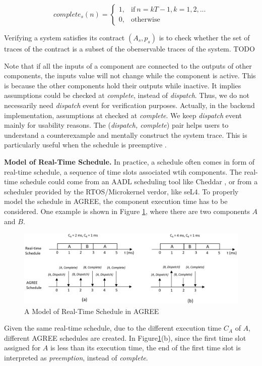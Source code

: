 \begin{equation}
\label{eqn:sys_complete}
    complete_s(n) =
    \begin{cases}
      1, & \text{if}\ n = kT-1, k=1,2,... \\
      0, & \text{otherwise}
    \end{cases}
\end{equation}

Verifying a system satisfies its contract $(A_s, p_s)$ is to check whether the set of traces of the contract is a subset of the oberservable traces of the system. TODO

Note that if all the inputs of a component are connected to the outputs of other components, the inputs value will not change while the component is active. This is because the other components hold their outputs while inactive. It implies assumptions could be checked at \emph{complete}, instead of \emph{dispatch}. Thus, we do not necessarily need \emph{dispatch} event for verification purposes. Actually, in the backend implementation, assumptions at checked at \emph{complete}. We keep \emph{dispatch} event mainly for usability reasons. The (\emph{dispatch, complete}) pair helps users to understand a counterexample and mentally construct the system trace. This is particularly useful when the schedule is preemptive .

{\bf Model of Real-Time Schedule.}
In practice, a schedule often comes in form of real-time schedule, a sequence of time slots associated wtih components. The real-time schedule could come from an AADL scheduling tool like Cheddar \cite{Cheddar}, or from a scheduler provided by the RTOS/Microkernel verdor, like seL4\cite{seL4}. To properly model the schedule in AGREE, the component execution time has to be considered. One example is shown in Figure \ref{RTschedule}, where there are two components $A$ and $B$. 
\begin{figure}[ht!]
\centering
\includegraphics[width=130mm]{RTschedule.jpg}
\caption{A Model of Real-Time Schedule in AGREE\label{RTschedule}}
\end{figure}
Given the same real-time schedule, due to the different execution time $C_A$ of $A$, different AGREE schedules are created. In Figure\ref{RTschedule}(b), since the first time slot assigned for $A$ is less than its execution time, the end of the first time slot is interpreted as \emph{preemption}, instead of \emph{complete}.

